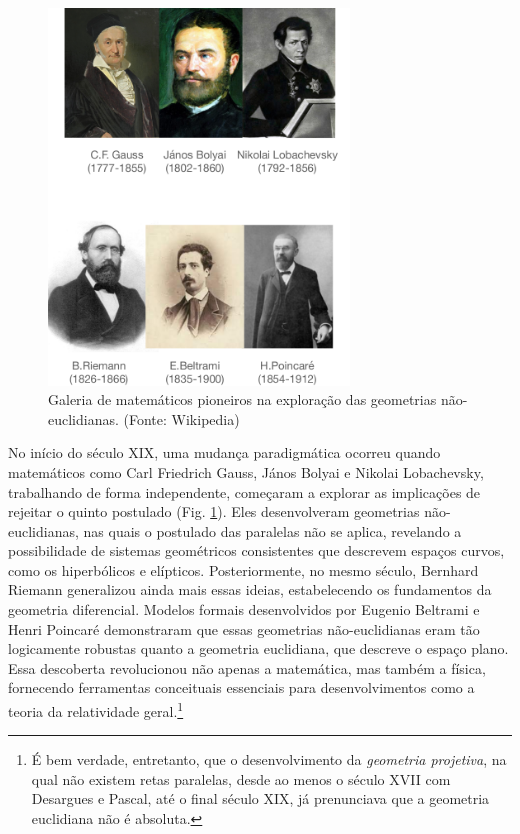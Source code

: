 \documentclass{hipatia}
\begin{document}
\begin{figure}[htb!]
\begin{center}
\includegraphics[width=8cm]{pioneiros.png}
\end{center}
\caption{\label{fig:Pioneiros}
Galeria de matemáticos pioneiros na 
exploração das geometrias não-euclidianas. 
(Fonte: Wikipedia)}   
\end{figure}

No início do século XIX, uma mudança paradigmática ocorreu
quando matemáticos como Carl Friedrich Gauss, János Bolyai e
Nikolai Lobachevsky, trabalhando de forma independente,
começaram a explorar as implicações de rejeitar o quinto
postulado (Fig. \ref{fig:Pioneiros}). Eles desenvolveram geometrias não-euclidianas,
nas quais o postulado das paralelas não se aplica, revelando
a possibilidade de sistemas geométricos consistentes que
descrevem espaços curvos, como os hiperbólicos e elípticos.
Posteriormente, no mesmo século, Bernhard Riemann
generalizou ainda mais essas ideias, estabelecendo os
fundamentos da geometria diferencial. Modelos formais
desenvolvidos por Eugenio Beltrami e Henri Poincaré
demonstraram que essas geometrias não-euclidianas eram tão
logicamente robustas quanto a geometria euclidiana, que
descreve o espaço plano. Essa descoberta revolucionou não
apenas a matemática, mas também a física, fornecendo
ferramentas conceituais essenciais para desenvolvimentos
como a teoria da relatividade geral.\footnote{
É bem verdade, entretanto, que o desenvolvimento da 
\emph{geometria projetiva}, na qual não existem
retas paralelas, desde ao menos o século XVII
com Desargues e Pascal, até o final século XIX,
já prenunciava que a geometria euclidiana não é 
absoluta.}
\end{document}
